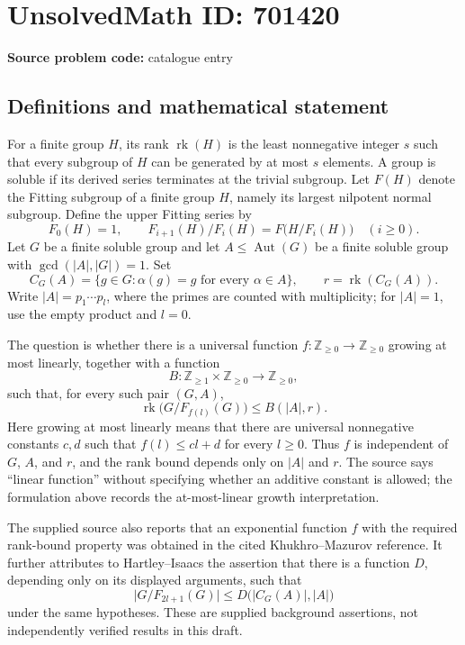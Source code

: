 \documentclass[11pt]{article}
\begin{document}
\section*{UnsolvedMath ID: 701420}
\textbf{Source problem code:} catalogue entry
\subsection{Definitions and mathematical statement}
For a finite group \(H\), its rank \(\operatorname{rk}(H)\) is the least nonnegative integer \(s\) such that every subgroup of \(H\) can be generated by at most \(s\) elements. A group is soluble if its derived series terminates at the trivial subgroup. Let \(F(H)\) denote the Fitting subgroup of a finite group \(H\), namely its largest nilpotent normal subgroup. Define the upper Fitting series by
\[
F_0(H)=1,\qquad F_{i+1}(H)/F_i(H)=F\bigl(H/F_i(H)\bigr)\quad(i\geq 0).
\]
Let \(G\) be a finite soluble group and let \(A\leq\operatorname{Aut}(G)\) be a finite soluble group with \(\gcd(|A|,|G|)=1\). Set
\[
C_G(A)=\{g\in G:\alpha(g)=g\text{ for every }\alpha\in A\},\qquad r=\operatorname{rk}(C_G(A)).
\]
Write \(|A|=p_1\cdots p_l\), where the primes are counted with multiplicity; for \(|A|=1\), use the empty product and \(l=0\).

The question is whether there is a universal function \(f:\mathbb Z_{\geq0}\to\mathbb Z_{\geq0}\) growing at most linearly, together with a function
\[
B:\mathbb Z_{\geq1}\times\mathbb Z_{\geq0}\longrightarrow\mathbb Z_{\geq0},
\]
such that, for every such pair \((G,A)\),
\[
\operatorname{rk}\bigl(G/F_{f(l)}(G)\bigr)\leq B(|A|,r).
\]
Here growing at most linearly means that there are universal nonnegative constants \(c,d\) such that \(f(l)\leq cl+d\) for every \(l\geq0\). Thus \(f\) is independent of \(G\), \(A\), and \(r\), and the rank bound depends only on \(|A|\) and \(r\). The source says ``linear function'' without specifying whether an additive constant is allowed; the formulation above records the at-most-linear growth interpretation.

The supplied source also reports that an exponential function \(f\) with the required rank-bound property was obtained in the cited Khukhro--Mazurov reference. It further attributes to Hartley--Isaacs the assertion that there is a function \(D\), depending only on its displayed arguments, such that
\[
\bigl|G/F_{2l+1}(G)\bigr|\leq D\bigl(|C_G(A)|,|A|\bigr)
\]
under the same hypotheses. These are supplied background assertions, not independently verified results in this draft.
\end{document}
